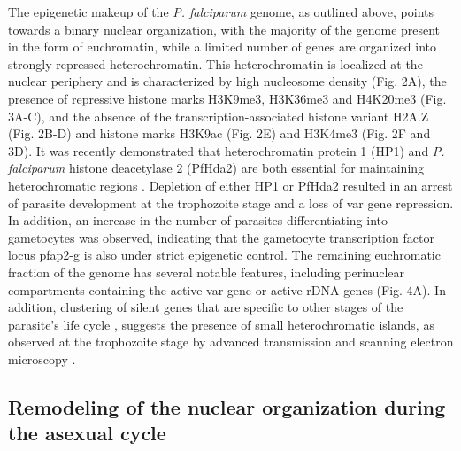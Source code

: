 The epigenetic makeup of the \textit{P. falciparum} genome, as outlined above, points
towards a binary nuclear organization, with the majority of the genome present
in the form of euchromatin, while a limited number of genes are organized into
strongly repressed heterochromatin. This heterochromatin is localized at the
nuclear periphery and is characterized by high nucleosome density (Fig. 2A),
the presence of repressive histone marks H3K9me3, H3K36me3 and H4K20me3 (Fig.
3A-C), and the absence of the transcription-associated histone variant H2A.Z
(Fig. 2B-D) and histone marks H3K9ac (Fig. 2E) and H3K4me3 (Fig. 2F and 3D).
It was recently demonstrated that heterochromatin protein 1 (HP1) and \textit{P.
falciparum} histone deacetylase 2 (PfHda2) are both essential for maintaining
heterochromatic regions \citep{brancucci:heterochromatin, coleman:plasmodium}.
Depletion of either HP1 or PfHda2 resulted in
an arrest of parasite development at the trophozoite stage and a loss of var
gene repression. In addition, an increase in the number of parasites
differentiating into gametocytes was observed, indicating that the gametocyte
transcription factor locus pfap2-g is also under strict epigenetic control.
The remaining euchromatic fraction of the genome has several notable features,
including perinuclear compartments containing the active var gene or active
rDNA genes (Fig. 4A). In addition, clustering of silent genes that are
specific to other stages of the parasite’s life cycle
\citep{ay:three-dimensional}, suggests the
presence of small heterochromatic islands, as observed at the trophozoite
stage by advanced transmission and scanning electron microscopy
\citep{weiner:3d}.

\subsection{Remodeling of the nuclear organization during the asexual cycle}


